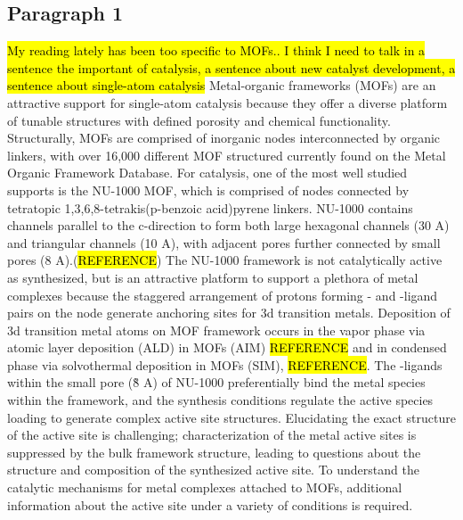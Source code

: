 \documentclass[journal=jctcce,manuscript=article]{achemso}
\begin{document}
\subsection{Paragraph 1}
\hl{My reading lately has been too specific to MOFs.. I think I need to talk in a sentence the important of catalysis, a sentence about new catalyst development, a sentence about single-atom catalysis} Metal-organic frameworks (MOFs) are an attractive support for single-atom catalysis because they offer a diverse platform of tunable structures with defined porosity and chemical functionality. Structurally, MOFs are comprised of inorganic nodes interconnected by organic linkers, with over 16,000 different MOF structured currently found on the Metal Organic Framework Database. For catalysis, one of the most well studied supports is the NU-1000 MOF, which is comprised of  nodes connected by tetratopic 1,3,6,8-tetrakis(p-benzoic acid)pyrene linkers. NU-1000 contains channels parallel to the c-direction to form both large hexagonal channels (30 A) and triangular channels (10 A), with adjacent pores further connected by small pores (8 A).(\hl{REFERENCE}) The NU-1000 framework is not catalytically active as synthesized, but is an attractive platform to support a plethora of metal complexes because the staggered arrangement of protons forming - and -ligand pairs on the node generate anchoring sites for 3d transition metals.\cite{Planas2014} Deposition of 3d transition metal atoms on MOF framework occurs in the vapor phase via atomic layer deposition (ALD) in MOFs (AIM) \hl{REFERENCE} and in condensed phase via solvothermal deposition in MOFs (SIM), \hl{REFERENCE}. The -ligands within the small pore (\~8 A) of NU-1000 preferentially bind the metal species within the framework,\cite{Gallington2016,Rimoldi2017} and the synthesis conditions regulate the active species loading to generate complex active site structures.\cite{Kim2015} Elucidating the exact structure of the active site is challenging; characterization of the metal active sites is suppressed by the bulk framework structure, leading to questions about the structure and composition of the synthesized active site. To understand the catalytic mechanisms for metal complexes attached to MOFs, additional information about the active site under a variety of conditions is required. 

\end{document}
